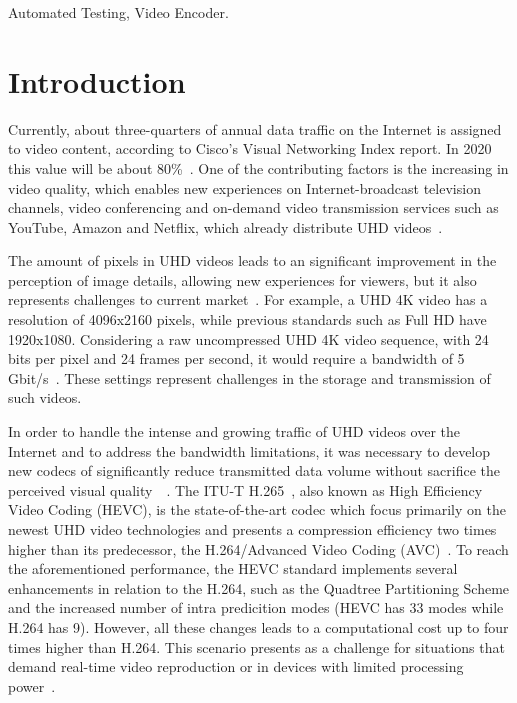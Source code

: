 \documentclass[journal]{IEEEtran}
\begin{document}
\begin{IEEEkeywords}
Automated Testing, Video Encoder.
\end{IEEEkeywords}


\IEEEpeerreviewmaketitle


\section{Introduction}

Currently, about three-quarters of annual data traffic on the Internet is assigned to video content, according to Cisco's Visual Networking Index report. 
In 2020 this value will be about 80\%~\cite{Cisco:16}. One of the contributing factors is the increasing in video quality, which enables new experiences on Internet-broadcast television channels, video conferencing and on-demand video transmission services such as YouTube, Amazon and Netflix, which already distribute UHD videos~\cite{cheon:14}.


The amount of pixels in UHD videos leads to an significant improvement in the perception of image details, allowing new experiences for viewers, but it also represents challenges to current market~\cite{cheon:14}. For example, a UHD 4K video has a resolution of 4096x2160 pixels, while previous standards such as Full HD have 1920x1080. Considering a raw uncompressed UHD 4K video sequence, with 24 bits per pixel and 24 frames per second, it would require a bandwidth of 5 Gbit/s~\cite{gomes:13}. These settings represent challenges in the storage and transmission of such videos.

In order to handle the intense and growing traffic of UHD videos over the Internet and to address the bandwidth limitations, it was necessary to develop new codecs of significantly reduce transmitted data volume without sacrifice the perceived visual quality~\cite{oliveira:16}\cite{wang:13}~\cite{netflix:16}. The ITU-T H.265~\cite{itu:265}, also known as High Efficiency Video Coding (HEVC), is the state-of-the-art codec which focus primarily on the newest UHD video technologies and presents a compression efficiency two times higher than its predecessor, the H.264/Advanced Video Coding (AVC)~\cite{Bossen:12}\cite{Hanhart:12}\cite{Sullivan:12}. To reach the aforementioned performance, the HEVC standard implements several enhancements in relation to the H.264, such as the Quadtree Partitioning Scheme and the increased number of intra predicition modes (HEVC has 33 modes while H.264 has 9). However, all these changes leads to a computational cost up to four times higher than H.264. This scenario presents as a challenge for situations that demand real-time video reproduction or in devices with limited processing power~\cite{Yoon:13}\cite{Correa:12}.
\end{document}
